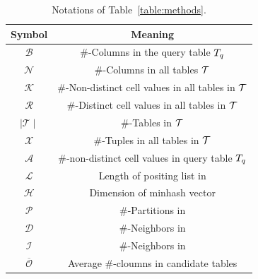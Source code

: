 \begin{table}[!ht]
	\centering
	\caption{ Notations of Table~\ref{table:methods}.}
	\begin{tabular}{|c|c|}
		\hline
		Symbol & Meaning \\ \hline
		$\mathcal{B}$ & \#-Columns in the query table $T_q$  \\\hline
		$\mathcal{N}$ &\#-Columns in all tables $\mathcal{T}$ \\\hline
		$\mathcal{K}$ & \#-Non-distinct cell values in all tables in $\mathcal{T}$   \\\hline
		$\mathcal{R}$ &\#-Distinct cell values in all tables in $\mathcal{T}$ \\\hline
		$\mid \mathcal{T} \mid$ & \#-Tables in $\mathcal{T}$  \\\hline
		$\mathcal{X}$ &\#-Tuples in all tables in $\mathcal{T}$ \\\hline
		$\mathcal{A}$ & \#-non-distinct cell values in query table $T_q$  \\\hline
		
		$\mathcal{L}$ & Length of positing list in \josie  \\\hline
		$\mathcal{H}$ & Dimension of minhash vector \\\hline
		$\mathcal{P}$ & \#-Partitions in \lsh\\\hline
		$\mathcal{D}$ & \#-Neighbors in \dlll\\\hline
		$\mathcal{I}$ & \#-Neighbors in \infogather\\\hline
		$\overline{\mathcal{O}}$ & Average  \#-cloumns in candidate tables
		\\ \hline






	
	\end{tabular}
	\label{symbol_table}
\end{table}



